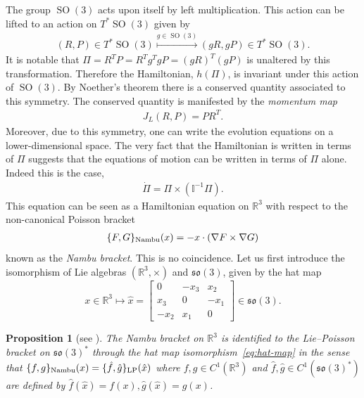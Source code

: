 \documentclass[12pt]{amsart}
\newcommand{\so}{\ensuremath{\mathfrak{so}}}
\newcommand{\R}{\ensuremath{\mathbb{R}}}
\newtheorem{prop}[thm]{Proposition}
\DeclareMathOperator{\SO}{SO}
\begin{document}
  The group $\SO(3)$ acts upon itself by left multiplication.
  This action can be lifted to an action on $T^*\SO(3)$ given by
  \begin{align*}
    (R,P) \in T^* \SO(3) \stackrel{g \in \SO(3) }{\mapsto}
    (g R , gP ) \in T^* \SO(3).
  \end{align*}
  It is notable that $\Pi = R^T P = R^T g^T g P = (gR)^T (gP)$
  is unaltered by this transformation.
  Therefore the Hamiltonian, $h(\Pi)$, is invariant under this action of $\SO(3)$.
  By Noether's theorem there is a conserved quantity associated to 
  this symmetry.
  The conserved quantity is manifested by the \emph{momentum map}
  \begin{align*}
    J_L(R,P) = PR^T .
  \end{align*}
  Moreover, due to this symmetry, one can write the evolution equations
  on a lower-dimensional space.
  The very fact that the Hamiltonian is written in terms of $\Pi$
  suggests that the equations of motion can be written in terms of $\Pi$ alone.
  Indeed this is the case,
  \begin{align}
    \dot{\Pi} = \Pi \times (\mathbb{I}^{-1} \Pi ). \label{eq:rigid_body}
  \end{align}
  This equation can be seen as a Hamiltonian equation on $\mathbb{R}^3$
  with respect to the non-canonical Poisson bracket
  \begin{align*}
    \{ F , G \}_{\rm Nambu}(x)  = - x \cdot (\nabla F \times \nabla G) %
  \end{align*}
  known as the \emph{Nambu bracket}.
  This is no coincidence. Let us first introduce the isomorphism of
  Lie algebras $(\R^3,\times)$ and $\so(3)$, given by the hat map
  \begin{equation}\label{eq:hat-map}
    x \in \R^3 \mapsto
    \hat{x} = 
    \begin{bmatrix}
      0   & -x_3 &  x_2 \\
      x_3 & 0    & -x_1 \\
     -x_2 &  x_1 & 0
    \end{bmatrix} \in \so(3).
  \end{equation}
  \begin{prop}[see {\cite[\S 2.5]{HolmBook2}}] \label{prop:Nambu}
    The Nambu bracket on $\mathbb{R}^3$
    is identified to the Lie--Poisson bracket on $\so(3)^*$
    through the hat map isomorphism~\eqref{eq:hat-map}
    in the sense that $\{ f,g\}_{\rm Nambu}( x) = \{ \hat{f} , \hat{g} \}_{\rm LP}( \hat{x})$
    where $f,g \in C^1(\mathbb{R}^3)$ and 
    $\hat{f},\hat{g} \in C^1(\so(3)^*)$ are defined by 
    $\hat{f}( \hat{x} ) = f(x), \hat{g}( \hat{x} ) = g(x)$.
  \end{prop}
\end{document}

